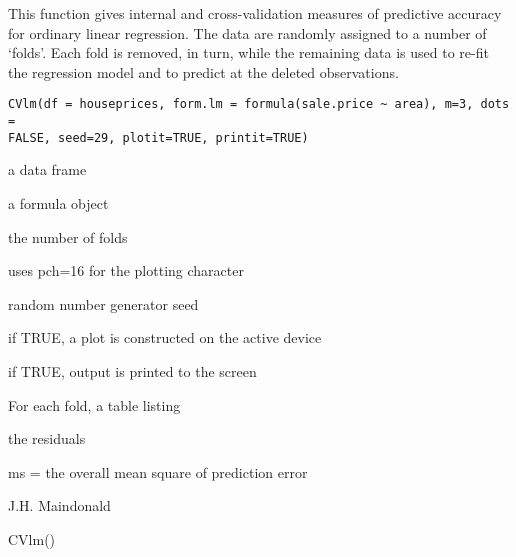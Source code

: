 \begin{Description}\relax
This function gives internal and cross-validation measures of predictive
accuracy for ordinary linear regression.  The data are 
randomly assigned to a number of `folds'.  
Each fold is removed, in turn, while the remaining data is used
to re-fit the regression model and to predict at the deleted observations.
\end{Description}
\begin{Usage}
\begin{verbatim}
CVlm(df = houseprices, form.lm = formula(sale.price ~ area), m=3, dots = 
FALSE, seed=29, plotit=TRUE, printit=TRUE)
\end{verbatim}
\end{Usage}
\begin{Arguments}
\begin{ldescription}
\item[\code{df}] a data frame
\item[\code{form.lm}] a formula object
\item[\code{m}] the number of folds
\item[\code{dots}] uses pch=16 for the plotting character
\item[\code{seed}] random number generator seed
\item[\code{plotit}] if TRUE, a plot is constructed on the active device
\item[\code{printit}] if TRUE, output is printed to the screen
\end{ldescription}
\end{Arguments}
\begin{Value}
For each fold, a table listing

\begin{ldescription}
\item[\code{ }] 
\item[\code{ }] 
\item[\code{ }] 
\item[\code{ }] 
\end{ldescription}
 the residuals

ms = the overall mean square of prediction error
\end{Value}
\begin{Author}\relax
J.H. Maindonald
\end{Author}
\begin{SeeAlso}\relax
{}
\end{SeeAlso}
\begin{Examples}
\begin{ExampleCode}
CVlm()
\end{ExampleCode}
\end{Examples}

